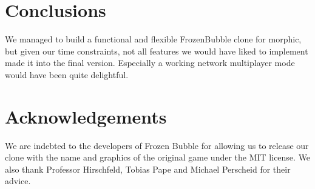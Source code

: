 \section{Conclusions}
We managed to build a functional and flexible FrozenBubble clone for morphic,
but given our time constraints, not all features we would have liked to implement
made it into the final version. Especially a working network multiplayer mode would
have been quite delightful.

\section*{Acknowledgements}
We are indebted to the developers of Frozen Bubble for allowing us to release 
our clone with the name and graphics of the original game under the MIT 
license. We also thank Professor Hirschfeld, Tobias Pape and Michael Perscheid for 
their advice.
